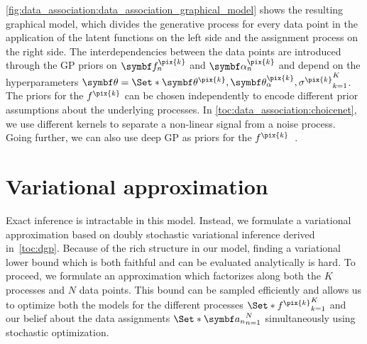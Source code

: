 \cref{fig:data_association:data_association_graphical_model} shows the resulting graphical model, which divides the generative process for every data point in the application of the latent functions on the left side and the assignment process on the right side.
The interdependencies between the data points are introduced through the GP priors on $\rv{f}_n^{\pix{k}}$ and $\rv{\alpha}_n^{\pix{k}}$ and depend on the hyperparameters $\mat{\theta} = \Set*{\mat{\theta}^{\pix{k}}, \mat{\theta}_\alpha^{\pix{k}}, \sigma^{\pix{k}}}_{k=1}^K$.
The priors for the $f^{\pix{k}}$ can be chosen independently to encode different prior assumptions about the underlying processes.
In \cref{toc:data_association:choicenet}, we use different kernels to separate a non-linear signal from a noise process.
Going further, we can also use deep GP as priors for the $f^{\pix{k}}$~\parencite{damianou_deep_2013, salimbeni_doubly_2017}.


\section{Variational approximation}
\label{toc:data_association:approximation}
Exact inference is intractable in this model.
Instead, we formulate a variational approximation based on doubly stochastic variational inference derived in~\cref{toc:dgp}.
Because of the rich structure in our model, finding a variational lower bound which is both faithful and can be evaluated analytically is hard.
To proceed, we formulate an approximation which factorizes along both the $K$ processes and $N$ data points.
This bound can be sampled efficiently and allows us to optimize both the models for the different processes $\Set*{f^{\pix{k}}}_{k=1}^K$ and our belief about the data assignments $\Set*{\mat{a}_n}_{n=1}^N$ simultaneously using stochastic optimization.

